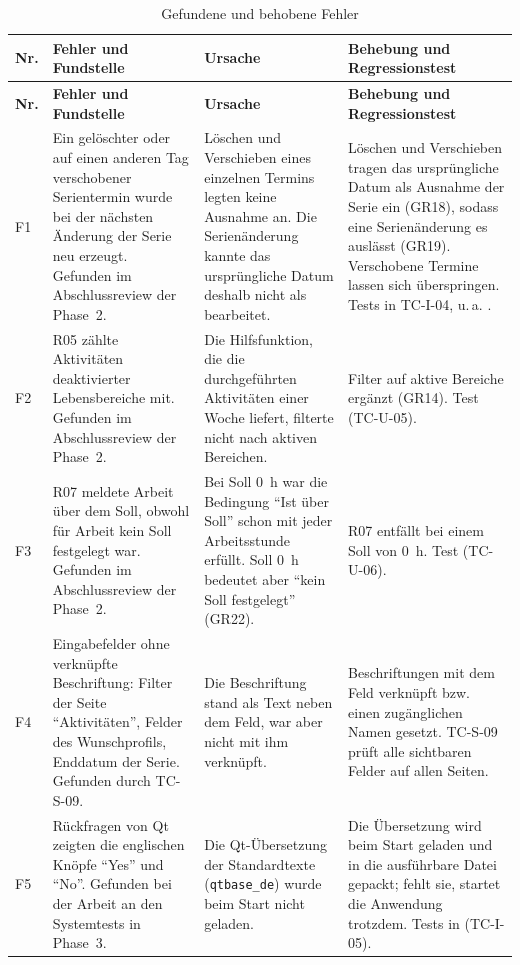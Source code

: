 \begin{longtable}{@{}L{0.7cm}L{4.4cm}L{4.6cm}L{6.0cm}@{}}
  \caption{Gefundene und behobene Fehler}\label{tab:fehler}\\
  \toprule
  \textbf{Nr.} & \textbf{Fehler und Fundstelle} & \textbf{Ursache} & \textbf{Behebung und Regressionstest} \\
  \midrule
  \endfirsthead
  \toprule
  \textbf{Nr.} & \textbf{Fehler und Fundstelle} & \textbf{Ursache} & \textbf{Behebung und Regressionstest} \\
  \midrule
  \endhead
  \bottomrule
  \endfoot
  F1 & Ein gelöschter oder auf einen anderen Tag verschobener Serientermin wurde bei der nächsten Änderung der Serie neu erzeugt. Gefunden im Abschlussreview der Phase~2. & Löschen und Verschieben eines einzelnen Termins legten keine Ausnahme an. Die Serienänderung kannte das ursprüngliche Datum deshalb nicht als bearbeitet. & Löschen und Verschieben tragen das ursprüngliche Datum als Ausnahme der Serie ein (GR18), sodass eine Serienänderung es auslässt (GR19). Verschobene Termine lassen sich überspringen. Tests in TC-I-04, u.\,a. . \\
  \midrule
  F2 & R05 zählte Aktivitäten deaktivierter Lebensbereiche mit. Gefunden im Abschlussreview der Phase~2. & Die Hilfsfunktion, die die durchgeführten Aktivitäten einer Woche liefert, filterte nicht nach aktiven Bereichen. & Filter auf aktive Bereiche ergänzt (GR14). Test  (TC-U-05). \\
  \midrule
  F3 & R07 meldete Arbeit über dem Soll, obwohl für Arbeit kein Soll festgelegt war. Gefunden im Abschlussreview der Phase~2. & Bei Soll 0~h war die Bedingung \enquote{Ist über Soll} schon mit jeder Arbeitsstunde erfüllt. Soll 0~h bedeutet aber \enquote{kein Soll festgelegt} (GR22). & R07 entfällt bei einem Soll von 0~h. Test  (TC-U-06). \\
  \midrule
  F4 & Eingabefelder ohne verknüpfte Beschriftung: Filter der Seite \enquote{Aktivitäten}, Felder des Wunschprofils, Enddatum der Serie. Gefunden durch TC-S-09. & Die Beschriftung stand als Text neben dem Feld, war aber nicht mit ihm verknüpft. & Beschriftungen mit dem Feld verknüpft bzw. einen zugänglichen Namen gesetzt. TC-S-09 prüft alle sichtbaren Felder auf allen Seiten. \\
  \midrule
  F5 & Rückfragen von Qt zeigten die englischen Knöpfe \enquote{Yes} und \enquote{No}. Gefunden bei der Arbeit an den Systemtests in Phase~3. & Die Qt-Übersetzung der Standardtexte (\texttt{qtbase\_de}) wurde beim Start nicht geladen. & Die Übersetzung wird beim Start geladen und in die ausführbare Datei gepackt; fehlt sie, startet die Anwendung trotzdem. Tests in  (TC-I-05). \\

\end{longtable}
